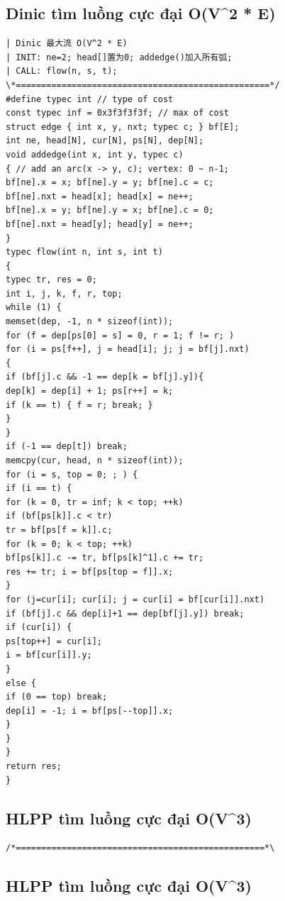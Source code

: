 \documentclass[11pt]{article}
\begin{document}
\subsection{Dinic tìm luồng cực đại O(V\textasciicircum{}2 * E)}

\begingroup
\scriptsize
\begin{verbatim}
| Dinic 最大流 O(V^2 * E)
| INIT: ne=2; head[]置为0; addedge()加入所有弧;
| CALL: flow(n, s, t);
\*==================================================*/
#define typec int // type of cost
const typec inf = 0x3f3f3f3f; // max of cost
struct edge { int x, y, nxt; typec c; } bf[E];
int ne, head[N], cur[N], ps[N], dep[N];
void addedge(int x, int y, typec c)
{ // add an arc(x -> y, c); vertex: 0 ~ n-1;
bf[ne].x = x; bf[ne].y = y; bf[ne].c = c;
bf[ne].nxt = head[x]; head[x] = ne++;
bf[ne].x = y; bf[ne].y = x; bf[ne].c = 0;
bf[ne].nxt = head[y]; head[y] = ne++;
}
typec flow(int n, int s, int t)
{
typec tr, res = 0;
int i, j, k, f, r, top;
while (1) {
memset(dep, -1, n * sizeof(int));
for (f = dep[ps[0] = s] = 0, r = 1; f != r; )
for (i = ps[f++], j = head[i]; j; j = bf[j].nxt)
{
if (bf[j].c && -1 == dep[k = bf[j].y]){
dep[k] = dep[i] + 1; ps[r++] = k;
if (k == t) { f = r; break; }
}
}
if (-1 == dep[t]) break;
memcpy(cur, head, n * sizeof(int));
for (i = s, top = 0; ; ) {
if (i == t) {
for (k = 0, tr = inf; k < top; ++k)
if (bf[ps[k]].c < tr)
tr = bf[ps[f = k]].c;
for (k = 0; k < top; ++k)
bf[ps[k]].c -= tr, bf[ps[k]^1].c += tr;
res += tr; i = bf[ps[top = f]].x;
}
for (j=cur[i]; cur[i]; j = cur[i] = bf[cur[i]].nxt)
if (bf[j].c && dep[i]+1 == dep[bf[j].y]) break;
if (cur[i]) {
ps[top++] = cur[i];
i = bf[cur[i]].y;
}
else {
if (0 == top) break;
dep[i] = -1; i = bf[ps[--top]].x;
}
}
}
return res;
}
\end{verbatim}
\endgroup

\subsection{HLPP tìm luồng cực đại O(V\textasciicircum{}3)}

\begingroup
\scriptsize
\begin{verbatim}
/*=================================================*\
\end{verbatim}
\endgroup

\subsection{HLPP tìm luồng cực đại O(V\textasciicircum{}3)}
\end{document}

